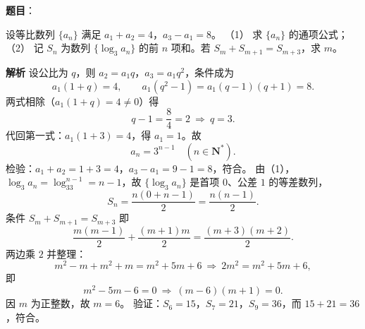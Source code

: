 \begin{answer}

\textbf{题目}：

设等比数列 $\{a_n\}$ 满足 $a_1+a_2=4$，$a_3-a_1=8$。
（1） 求 $\{a_n\}$ 的通项公式；
（2） 记 $S_n$ 为数列 $\{\log_3a_n\}$ 的前 $n$ 项和。若 $S_m+S_{m+1}=S_{m+3}$，求 $m$。

\textbf{解析}
设公比为 $q$，则 $a_2=a_1q$，$a_3=a_1q^2$，条件成为
\nopagebreak[4]
\[a_1(1+q)=4,\qquad a_1(q^2-1)=a_1(q-1)(q+1)=8 .\]
两式相除（$a_1(1+q)=4\neq0$）得
\nopagebreak[4]
\[q-1=\frac84=2\ \Longrightarrow\ q=3 .\]
代回第一式：$a_1(1+3)=4$，得 $a_1=1$。故
\nopagebreak[4]
\[a_n=3^{n-1}\quad(n\in\mathbf N^*) .\]
检验：$a_1+a_2=1+3=4$，$a_3-a_1=9-1=8$，符合。
由（1），$\log_3a_n=\log_33^{n-1}=n-1$，故 $\{\log_3a_n\}$ 是首项 $0$、公差 $1$ 的等差数列，
\nopagebreak[4]
\[S_n=\frac{n(0+n-1)}2=\frac{n(n-1)}2 .\]
条件 $S_m+S_{m+1}=S_{m+3}$ 即
\nopagebreak[4]
\[\frac{m(m-1)}2+\frac{(m+1)m}2=\frac{(m+3)(m+2)}2 .\]
两边乘 $2$ 并整理：
\nopagebreak[4]
\[m^2-m+m^2+m=m^2+5m+6\ \Longrightarrow\ 2m^2=m^2+5m+6,\]
即
\nopagebreak[4]
\[m^2-5m-6=0\ \Longrightarrow\ (m-6)(m+1)=0 .\]
因 $m$ 为正整数，故 $m=6$。
验证：$S_6=15$，$S_7=21$，$S_9=36$，而 $15+21=36$，符合。



\end{answer}
